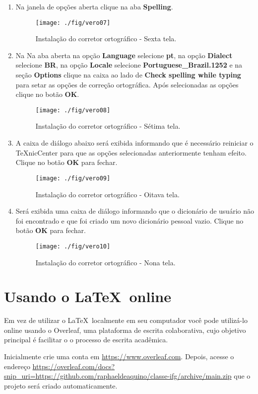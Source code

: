 \begin{enumerate}
\begin{figure}[H]
\end{figure}
\item Na janela de opções aberta clique na aba \textbf{Spelling}.
\begin{figure}[H]
  \centering
  \texttt{[image: ./fig/vero07]}
  \caption{Instalação do corretor ortográfico - Sexta tela.}
\end{figure}
\item Na Na aba aberta na opção \textbf{Language} selecione \textbf{pt}, na opção \textbf{Dialect} selecione \textbf{BR}, na opção \textbf{Locale} selecione \textbf{Portuguese\_Brazil.1252} e na seção \textbf{Options} clique na caixa ao lado de \textbf{Check spelling while typing} para setar as opções de correção ortográfica. Após selecionadas as opções clique no botão \textbf{OK}.
\begin{figure}[H]
  \centering
  \texttt{[image: ./fig/vero08]}
  \caption{Instalação do corretor ortográfico - Sétima tela.}
\end{figure}
\item A caixa de diálogo abaixo será exibida informando que é necessário reiniciar o TeXnicCenter para que as opções selecionadas anteriormente tenham efeito. Clique no botão \textbf{OK} para fechar.
\begin{figure}[H]
  \centering
  \texttt{[image: ./fig/vero09]}
  \caption{Instalação do corretor ortográfico - Oitava tela.}
\end{figure}
\item Será exibida uma caixa de diálogo informando que o dicionário de usuário não foi encontrado e que foi criado um novo dicionário pessoal vazio. Clique no botão \textbf{OK} para fechar.
\begin{figure}[H]
  \centering
  \texttt{[image: ./fig/vero10]}
  \caption{Instalação do corretor ortográfico - Nona tela.}
\end{figure}
\end{enumerate}

\section{Usando o \LaTeX\ online}

Em vez de utilizar o \LaTeX\ localmente em seu computador você pode utilizá-lo online usando o Overleaf, uma plataforma de escrita colaborativa, cujo objetivo principal  é facilitar o o processo de escrita acadêmica.

Inicialmente crie uma conta em \url{https://www.overleaf.com}. Depois, acesse o endereço \url{https://overleaf.com/docs?snip_uri=https://github.com/raphaeldeaquino/classe-ifg/archive/main.zip} que o projeto será criado automaticamente.